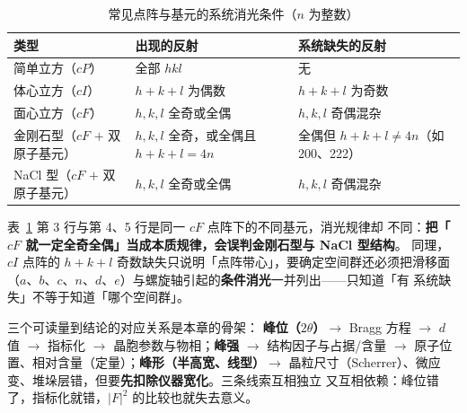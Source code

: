 \begin{table}[htbp]
\centering
\caption{常见点阵与基元的系统消光条件（$n$ 为整数）}
\label{tab:extinction-ch04}
{\srcsize
\begin{tabularx}{\columnwidth}{@{}lXX@{}}
\toprule
类型 & 出现的反射 & 系统缺失的反射 \\
\midrule
简单立方（$cP$） & 全部 $hkl$ & 无 \\
体心立方（$cI$） & $h+k+l$ 为偶数 & $h+k+l$ 为奇数 \\
面心立方（$cF$） & $h,k,l$ 全奇或全偶 & $h,k,l$ 奇偶混杂 \\
金刚石型（$cF$ $+$ 双原子基元） & $h,k,l$ 全奇，或全偶且 $h+k+l=4n$ & 全偶但 $h+k+l\neq4n$（如 200、222） \\
NaCl 型（$cF$ $+$ 双原子基元） & $h,k,l$ 全奇或全偶 & $h,k,l$ 奇偶混杂 \\
\bottomrule
\end{tabularx}}
\end{table}

\begin{pitfall}
表~\ref{tab:extinction-ch04} 第 3 行与第 4、5 行是同一 $cF$ 点阵下的不同基元，消光规律却
不同：\textbf{把「$cF$ 就一定全奇全偶」当成本质规律，会误判金刚石型与 NaCl 型结构}。
同理，$cI$ 点阵的 $h+k+l$ 奇数缺失只说明「点阵带心」，要确定空间群还必须把滑移面
（$a$、$b$、$c$、$n$、$d$、$e$）与螺旋轴引起的\textbf{条件消光}一并列出——只知道「有
系统缺失」不等于知道「哪个空间群」。
\end{pitfall}

\begin{dataflow}
三个可读量到结论的对应关系是本章的骨架：
\textbf{峰位（$2\theta$）}$\rightarrow$ Bragg 方程 $\rightarrow$ $d$ 值 $\rightarrow$
指标化 $\rightarrow$ 晶胞参数与物相；\textbf{峰强} $\rightarrow$ 结构因子与占据/含量
$\rightarrow$ 原子位置、相对含量（定量）；\textbf{峰形（半高宽、线型）}$\rightarrow$
晶粒尺寸（Scherrer）、微应变、堆垛层错，但要\textbf{先扣除仪器宽化}。三条线索互相独立
又互相依赖：峰位错了，指标化就错，$|F|^{2}$ 的比较也就失去意义。
\end{dataflow}

